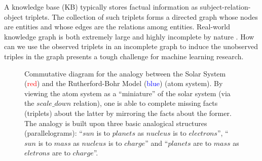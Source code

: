 \documentclass{article}
\begin{document}
A knowledge base (KB) typically stores factual information as subject-relation-object triplets. 
The collection of such triplets forms a directed graph whose nodes are entities and whose edges are the relations among entities.
Real-world knowledge graph is both extremely large and highly incomplete by nature \cite{min2013distant}.  How can we use the observed triplets in an incomplete graph to induce the unobserved triples in the graph presents a tough challenge for machine learning research.  
\begin{figure}[t]
    \centering
    \caption{Commutative diagram for the analogy between the Solar System (\textcolor{red}{red}) and the Rutherford-Bohr Model (\textcolor{blue}{blue}) (atom system).
    By viewing the atom system as a ``miniature'' of the solar system (via the $scale\_down$ relation),
    one is able to complete missing facts (triplets) about the latter by mirroring the facts about the former.
        The analogy is built upon three basic analogical structures (parallelograms):
        ``$sun$ is to $planets$ as $nucleus$ is to $electrons$'', ``$sun$ is to $mass$ as $nucleus$ is to $charge$'' and ``$planets$ are to $mass$ as $eletrons$ are to $charge$''.
    }
    \label{fig:solar}
\end{figure}
\end{document}
